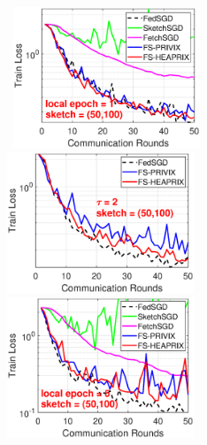 \documentclass{article}
\begin{document}
\begin{figure}[H]
\begin{center}
		\mbox{\hspace{-0.15in}	  
		\includegraphics[width=2.2in]{MNIST_figures/local1_sketch50_iid0_train_loss.eps} \hspace{-0.15in}
		\includegraphics[width=2.2in]{MNIST_figures/local2_sketch50_iid0_train_loss.eps} \hspace{-0.15in}
		\includegraphics[width=2.2in]{MNIST_figures/local5_sketch50_iid0_train_loss.eps}}
		

\end{center}
\end{figure}
\end{document}
